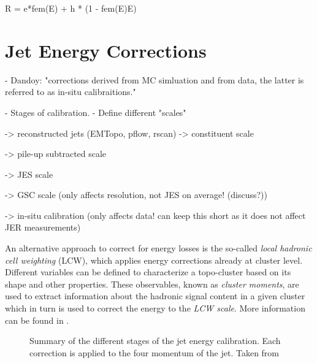 R = e*fem(E) + h * (1 - fem(E)E)



\section{Jet Energy Corrections}

- Dandoy: "corrections derived from MC simluation and from data, the latter is referred to as in-situ calibraitions."

- Stages of calibration. 
- Define different "scales"

-> reconstructed jets (EMTopo, pflow, rscan) -> constituent scale

-> pile-up subtracted scale

-> JES scale

-> GSC scale (only affects resolution, not JES on average! (discuss?))

-> in-situ calibration (only affects data! can keep this short as it does not affect JER measurements)



An alternative approach to correct for energy losses is the so-called \emph{local hadronic cell weighting} (LCW), which applies energy corrections already at cluster level. Different variables can be defined to characterize a topo-cluster based on its shape and other properties. These observables, known as \emph{cluster moments}, are used to extract information about the hadronic signal content in a given cluster which in turn is used to correct the energy to the \emph{LCW scale}. More information can be found in .

\begin{figure}
    \caption{Summary of the different stages of the jet energy calibration. Each correction is applied to the four momentum of the jet. Taken from }
    \label{fig:jes-calibration}
\end{figure}



